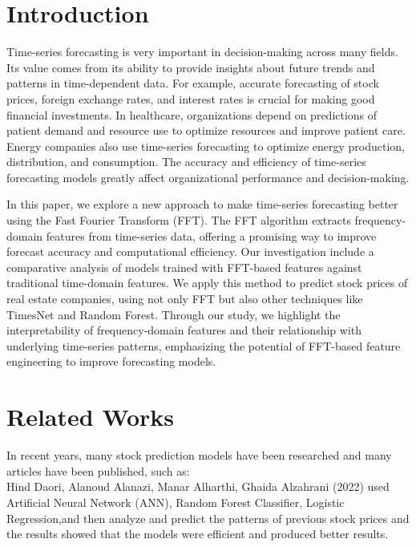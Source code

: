 \documentclass{ieeeojies}
\begin{document}
\section{Introduction}
\label{sec:introduction}
Time-series forecasting is very important in decision-making across many fields. Its value comes from its ability to provide insights about future trends and patterns in time-dependent data. For example, accurate forecasting of stock prices, foreign exchange rates, and interest rates is crucial for making good financial investments. In healthcare, organizations depend on predictions of patient demand and resource use to optimize resources and improve patient care. Energy companies also use time-series forecasting to optimize energy production, distribution, and consumption. The accuracy and efficiency of time-series forecasting models greatly affect organizational performance and decision-making.

In this paper, we explore a new approach to make time-series forecasting better using the Fast Fourier Transform (FFT). The FFT algorithm extracts frequency-domain features from time-series data, offering a promising way to improve forecast accuracy and computational efficiency. Our investigation include a comparative analysis of models trained with FFT-based features against traditional time-domain features. We apply this method to predict stock prices of real estate companies, using not only FFT but also other techniques like TimesNet and Random Forest. Through our study, we highlight the interpretability of frequency-domain features and their relationship with underlying time-series patterns, emphasizing the potential of FFT-based feature engineering to improve forecasting models.

\section{Related Works}

In recent years, many stock prediction models have been researched and many articles have been published, such as: \\

Hind Daori, Alanoud Alanazi, Manar Alharthi, Ghaida Alzahrani (2022)\cite{b1} used Artificial Neural Network (ANN), Random Forest
Classifier, Logistic Regression,and then analyze and predict the
patterns of previous stock prices and the results showed that the models were efficient and produced better results.\\
\end{document}

